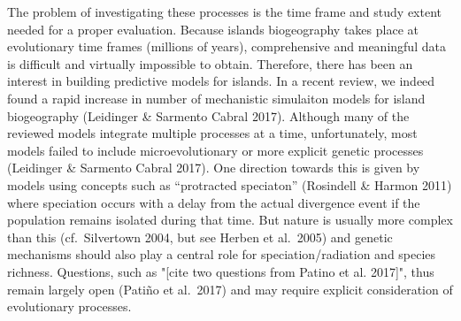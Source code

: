 \documentclass[a4paper]{scrartcl}
\begin{document}
The problem of investigating these processes is the time frame and study extent needed for a proper evaluation.
Because islands biogeography takes place at evolutionary time frames (millions of years),
comprehensive and meaningful data is difficult and virtually impossible to obtain. Therefore, there has been an interest in building predictive models for islands. In a recent review, we indeed found a rapid increase in number of mechanistic simulaiton models for island biogeography %
(Leidinger \& Sarmento Cabral 2017).
Although many of the reviewed models integrate multiple processes at a time, unfortunately, most models failed to include microevolutionary or more explicit genetic processes %
(Leidinger \& Sarmento Cabral 2017).
One direction towards this is given by models using concepts such as ``protracted speciaton'' (Rosindell \& Harmon 2011) %
where speciation occurs with a delay from the actual
divergence event if the population remains isolated during that time.
But nature is usually more complex than this (cf.\ Silvertown 2004, but see Herben et al.\ 2005) and genetic mechanisms should also play a central role for speciation/radiation and species richness. Questions, such as "[cite two questions from Patino et al. 2017]", thus remain largely open (Patiño et al.\ 2017) and may require explicit consideration of evolutionary processes.
\end{document}
